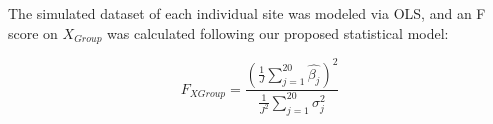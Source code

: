 The simulated dataset of each individual site was modeled via OLS, and an F score on $X_{Group}$ was calculated following our proposed statistical model:

\begin{equation}
F_{X{Group}} = \frac{(\frac{1}{J}\sum_{j=1}^{20}\hat{\beta_j})^2}{\frac{1}{J^2}\sum_{j=1}^{20}\sigma^2_j}
\end{equation}